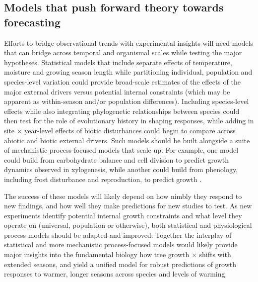 \documentclass[11pt]{article}
\begin{document}
\subsection*{Models that push forward theory towards forecasting}
Efforts to bridge observational trends with experimental insights will need models that can bridge across temporal and organismal scales while testing the major hypotheses. %
Statistical models that include separate effects of temperature, moisture and growing season length while partitioning individual, population and species-level variation could provide broad-scale estimates of the effects of the major external drivers versus potential internal constraints (which may be apparent as within-season and/or population differences). Including species-level effects while also integrating phylogenetic relationships between species could then test for the role of evolutionary history in shaping responses, while adding in site $\times$ year-level effects of biotic disturbances could begin to compare across abiotic and biotic external drivers. Such models should be built alongside a suite of mechanistic process-focused models that scale up. For example, one model could build from carbohydrate balance and cell division \citep[e.g.][]{locosselli2017dendrobiochemistry} to predict growth dynamics observed in xylogenesis, while another could build from phenology, including frost disturbance and reproduction, to predict growth \citep[e.g.][]{chuineJTB}. 

The success of these models will likely depend on how nimbly they respond to new findings, and how well they make predictions for new studies to test. As new experiments identify potential internal growth constraints and what level they operate on (universal, population or otherwise), both statistical and physiological process models should be adapted and improved. Together the interplay of statistical and more mechanistic process-focused models would likely provide major insights into the fundamental biology how tree growth $\times$ shifts with extended seasons, and yield a unified model for robust predictions of growth responses to warmer, longer seasons across species and levels of warming. 
\end{document}
